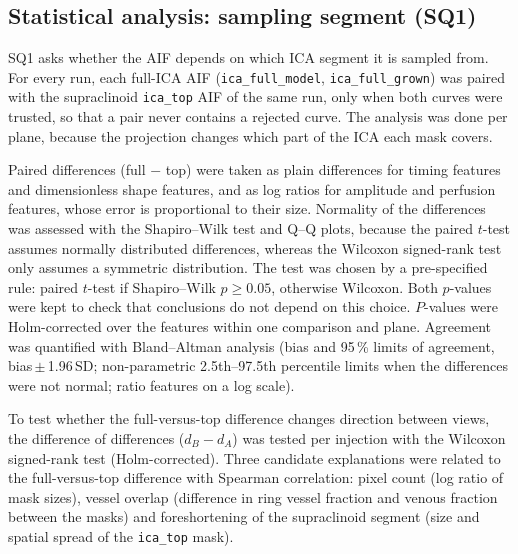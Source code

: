 \subsection{Statistical analysis: sampling segment (SQ1)}
\label{sec:sq1_methods}
SQ1 asks whether the AIF depends on which ICA segment it is sampled from. For every run, each full-ICA AIF
(\texttt{ica\_full\_model}, \texttt{ica\_full\_grown}) was paired with the supraclinoid \texttt{ica\_top} AIF of
the same run, only when both curves were trusted, so that a pair never contains a rejected curve. The analysis
was done per plane, because the projection changes which part of the ICA each mask covers.

Paired differences (full $-$ top) were taken as plain differences for timing features and dimensionless shape
features, and as log ratios for amplitude and perfusion features, whose error is proportional to their size.
Normality of the differences was assessed with the Shapiro--Wilk test and Q--Q plots, because the paired
$t$-test assumes normally distributed differences, whereas the Wilcoxon signed-rank test only assumes a
symmetric distribution. The test was chosen by a pre-specified rule: paired $t$-test if Shapiro--Wilk
$p \geq 0.05$, otherwise Wilcoxon. Both $p$-values were kept to check that conclusions do not depend on this
choice. $P$-values were Holm-corrected over the features within one comparison and plane. Agreement was
quantified with Bland--Altman analysis (bias and 95\,\% limits of agreement, bias\,$\pm$\,1.96\,SD;
non-parametric 2.5th--97.5th percentile limits when the differences were not normal; ratio features on a log
scale).

To test whether the full-versus-top difference changes direction between views, the difference of differences
($d_B - d_A$) was tested per injection with the Wilcoxon signed-rank test (Holm-corrected). Three candidate
explanations were related to the full-versus-top difference with Spearman correlation: pixel count (log ratio of
mask sizes), vessel overlap (difference in ring vessel fraction and venous fraction between the masks) and
foreshortening of the supraclinoid segment (size and spatial spread of the \texttt{ica\_top} mask).
